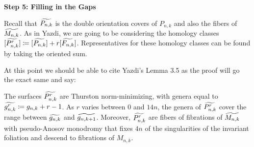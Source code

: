 \textbf{Step 5: Filling in the Gaps}

Recall that $\widetilde{P_{n,k}}$ is the double orientation covers of $P_{n,k}$ and also the fibers of $\widetilde{M_{n,k}}$. As in Yazdi, we are going to be considering the homology classes $[\widetilde{P^r_{n,k}}] \coloneqq [\widetilde{P_{n,k}}] + r[\widetilde{F_{n,k}}]$. Representatives for these homology classes can be found by taking the oriented sum.

At this point we should be able to cite Yazdi's Lemma 3.5 as the proof will go the exact same and say:

\begin{lem}
The surfaces $\widetilde{P^r_{n,k}}$ are Thurston norm-minimizing, with genera equal to $\widetilde{g^r_{n,k}} \coloneqq g_{n,k} + r - 1$. As $r$ varies between $0$ and $14n$, the genera of $\widetilde{P^r_{n,k}}$ cover the range between $\widetilde{g_{n,k}}$ and $\widetilde{g_{n,k+1}}$. Moreover, $\widetilde{P^r_{n,k}}$ are fibers of fibrations of $\widetilde{M_{n,k}}$ with pseudo-Anosov monodromy that fixes $4n$ of the singularities of the invariant foliation and descend to fibrations of $M_{n,k}$.
\end{lem}

